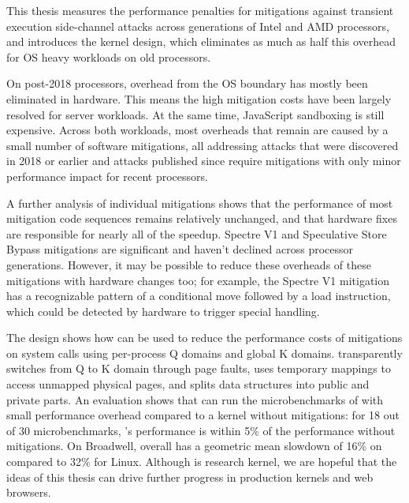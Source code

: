\label{s:concl}

This thesis measures the performance penalties for
mitigations against transient execution side-channel attacks across generations of Intel and AMD
processors, and introduces the \sys kernel design, which eliminates as much
as half this overhead for OS heavy workloads on old processors.

On post-2018 processors, overhead from the OS boundary has mostly been eliminated in hardware.
This means the high mitigation costs have been largely resolved for server workloads.
At the same time, JavaScript sandboxing is still expensive.
Across both workloads, most overheads that remain  are caused by a small number of software mitigations, all addressing attacks that were discovered in 2018 or earlier and attacks published since require mitigations with only minor performance impact for recent processors.

A further analysis of individual mitigations shows that the performance of most mitigation code sequences remains relatively unchanged, and that hardware fixes are responsible for nearly all of the speedup.
Spectre V1 and Speculative Store Bypass mitigations are significant and haven't declined across processor generations.
However, it may be possible to reduce these overheads of these mitigations with hardware changes too;
for example, the Spectre V1 mitigation has a recognizable pattern of a
conditional move followed by a load instruction, which could be
detected by hardware to trigger special handling.

The \sys design
shows how \contract can be used to reduce the performance costs of
mitigations on system calls using per-process Q domains and global K
domains.  \sys transparently switches from Q to K domain through page
faults, uses temporary mappings to access unmapped physical pages, and
splits data structures into public and private parts.  An evaluation
shows that \sys can run the microbenchmarks of \bench with small
performance overhead compared to a kernel without mitigations: for
18 out of 30 \bench microbenchmarks, \sys's performance is within 5\%
of the performance without mitigations.
On Broadwell, \sys overall has a geometric mean slowdown of 16\% on \bench compared to 32\% for Linux.
Although \sys is research kernel, we are hopeful that the ideas of this thesis can drive further progress in production kernels and web browsers.
